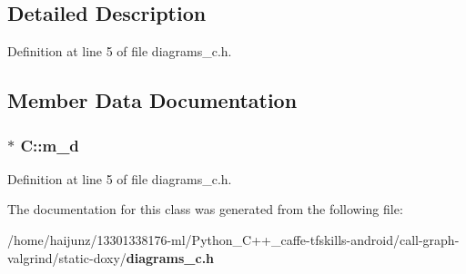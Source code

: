 \subsection{Detailed Description}


Definition at line 5 of file diagrams\-\_\-c.\-h.



\subsection{Member Data Documentation}
\subsubsection[{m\-\_\-d}]{$\ast$ C\-::m\-\_\-d}\label{class_c_a4ef972d28b73ff78eba3ab4f54c3b449}


Definition at line 5 of file diagrams\-\_\-c.\-h.



The documentation for this class was generated from the following file\-:\begin{DoxyCompactItemize}
\item 
/home/haijunz/13301338176-\/ml/\-Python\-\_\-\-C++\-\_\-caffe-\/tfskills-\/android/call-\/graph-\/valgrind/static-\/doxy/{\bf diagrams\-\_\-c.\-h}\end{DoxyCompactItemize}
